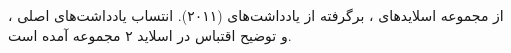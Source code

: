 ، از مجموعه اسلایدهای ،
برگرفته از یادداشت‌های  (۲۰۱۱).
انتساب یادداشت‌های اصلی و توضیح اقتباس در اسلاید ۲ مجموعه
 آمده است.
